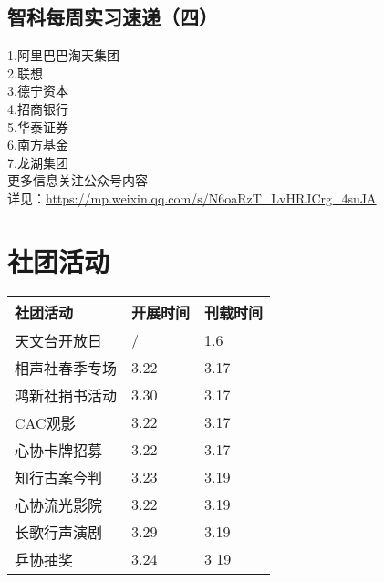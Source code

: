 \documentclass[letterpaper, 12pt]{article}
\begin{document}
\begin{multicols}{2}
\subsection{智科每周实习速递（四）}
1.阿里巴巴淘天集团
\\2.联想
\\3.德宁资本
\\4.招商银行
\\5.华泰证券
\\6.南方基金
\\7.龙湖集团
\\更多信息关注公众号内容
\\详见：\url{https://mp.weixin.qq.com/s/N6oaRzT_LvHRJCrg_4suJA}
\section{社团活动}
\begin{tabular}{|>{\centering\arraybackslash}m{}|m{}|m{}|}
    \hline
    社团活动 & 开展时间 & 刊载时间\\
    \hline\hline
    天文台开放日 & / & 1.6\\
    相声社春季专场 & 3.22 & 3.17\\
    鸿新社捐书活动 & 3.30 & 3.17\\
    CAC观影 & 3.22 & 3.17\\
    心协卡牌招募 & 3.22 & 3.17\\
    知行古案今判 & 3.23 & 3.19\\
    心协流光影院 & 3.22 & 3.19\\
    长歌行声演剧 & 3.29 & 3.19\\
    乒协抽奖 & 3.24 & 3 19\\
    \hline
\end{tabular}

\end{multicols}
\end{document}
